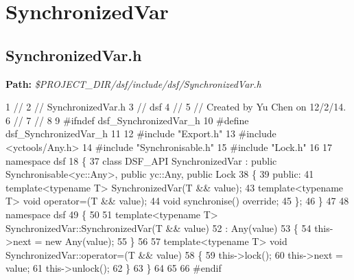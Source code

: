  \hypertarget{_dual_state_framework_DualStateFrameworkSynchronizedVar}{}\section{Synchronized\+Var}\label{_dual_state_framework_DualStateFrameworkSynchronizedVar}
\hypertarget{_dual_state_framework_DualStateFrameworkSynchronizedVar_h}{}\subsection{Synchronized\+Var.\+h}\label{_dual_state_framework_DualStateFrameworkSynchronizedVar_h}
{\bfseries Path\+:} {\itshape \$\+P\+R\+O\+J\+E\+C\+T\+\_\+\+D\+I\+R/dsf/include/dsf/\+Synchronized\+Var.h} 
\begin{DoxyCodeInclude}
1 \textcolor{comment}{//}
2 \textcolor{comment}{//  SynchronizedVar.h}
3 \textcolor{comment}{//  dsf}
4 \textcolor{comment}{//}
5 \textcolor{comment}{//  Created by Yu Chen on 12/2/14.}
6 \textcolor{comment}{//}
7 \textcolor{comment}{//}
8 
9 \textcolor{preprocessor}{#ifndef dsf\_SynchronizedVar\_h}
10 \textcolor{preprocessor}{#define dsf\_SynchronizedVar\_h}
11 
12 \textcolor{preprocessor}{#include "Export.h"}
13 \textcolor{preprocessor}{#include <yctools/Any.h>}
14 \textcolor{preprocessor}{#include "Synchronisable.h"}
15 \textcolor{preprocessor}{#include "Lock.h"}
16 
17 \textcolor{keyword}{namespace }dsf
18 \{
37     \textcolor{keyword}{class }DSF\_API SynchronizedVar : \textcolor{keyword}{public} Synchronisable<yc::Any>, \textcolor{keyword}{public} yc::Any, \textcolor{keyword}{public} Lock
38     \{
39     \textcolor{keyword}{public}:
41         \textcolor{keyword}{template}<\textcolor{keyword}{typename} T> SynchronizedVar(T && value);
43         \textcolor{keyword}{template}<\textcolor{keyword}{typename} T> \textcolor{keywordtype}{void} operator=(T && value);
44         \textcolor{keywordtype}{void} synchronise() \textcolor{keyword}{override};
45     \};
46 \}
47 
48 \textcolor{keyword}{namespace }dsf
49 \{
50     
51     \textcolor{keyword}{template}<\textcolor{keyword}{typename} T> SynchronizedVar::SynchronizedVar(T && value)
52     : Any(value)
53     \{
54         this->next = \textcolor{keyword}{new} Any(value);
55     \}
56     
57     \textcolor{keyword}{template}<\textcolor{keyword}{typename} T> \textcolor{keywordtype}{void} SynchronizedVar::operator=(T && value)
58     \{
59         this->lock();
60         this->next = value;
61         this->unlock();
62     \}
63 \}
64 
65 
66 \textcolor{preprocessor}{#endif}
\end{DoxyCodeInclude}
